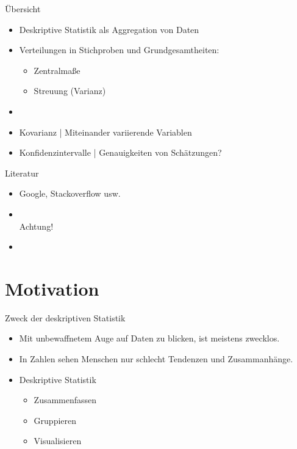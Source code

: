 
\begin{frame}
  {Übersicht}
  \begin{itemize}[<+->]
    \item Deskriptive Statistik als \alert{Aggregation von Daten}
      \Halbzeile
    \item Verteilungen in Stichproben und Grundgesamtheiten:
      \begin{itemize}
	\item Zentralmaße
	\item Streuung (Varianz)
      \end{itemize}
    \item {}
      \Halbzeile
    \item \alert{Kovarianz} | Miteinander variierende Variablen
      \Halbzeile
    \item \alert{Konfidenzintervalle} | Genauigkeiten von Schätzungen?
  \end{itemize}
\end{frame}

\begin{frame}
  {Literatur}
  \begin{itemize}
    \item Google, Stackoverflow usw.
      \Zeile
    \item \citet{GravetterWallnau2007}\\
      Achtung! 
      \Halbzeile
    \item \citet{Bortz2010}
  \end{itemize}
\end{frame}

\section{Motivation}

\begin{frame}
  {Zweck der deskriptiven Statistik}
  \begin{itemize}[<+->]
    \item Mit unbewaffnetem Auge auf Daten zu blicken, ist meistens zwecklos.
      \Halbzeile
    \item In Zahlen sehen Menschen nur schlecht Tendenzen und Zusammanhänge.
      \Zeile
    \item Deskriptive Statistik
      \begin{itemize}[<+->]
        \item \alert{Zusammenfassen}
        \item \alert{Gruppieren}
        \item \alert{Visualisieren}
      \end{itemize}
  \end{itemize}
\end{frame}


